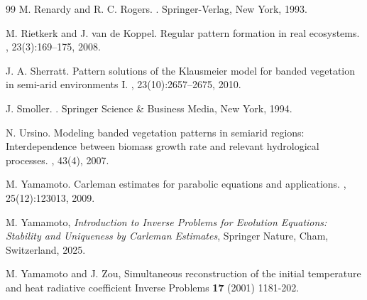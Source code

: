 \documentclass[12pt]{amsart}
\theoremstyle{plain}
\theoremstyle{definition}
\theoremstyle{remark}
\begin{document}
\begin{thebibliography}{99}
M. Renardy and R. C. Rogers.
.
\newblock Springer-Verlag, New York, 1993.

M. Rietkerk and J. van de Koppel.
\newblock Regular pattern formation in real ecosystems.
, 23(3):169--175, 2008.

J. A. Sherratt.
\newblock Pattern solutions of the Klausmeier model for banded vegetation in semi-arid environments I.
, 23(10):2657--2675, 2010.

J. Smoller.
. 
\newblock Springer Science \& Business Media, New York, 1994.

N. Ursino.
\newblock Modeling banded vegetation patterns in semiarid regions: Interdependence between biomass growth rate and relevant hydrological processes.
, 43(4), 2007.

M. Yamamoto.
\newblock Carleman estimates for parabolic equations and applications.
, 25(12):123013, 2009.


M. Yamamoto,
{\it Introduction to Inverse Problems for Evolution Equations: Stability and Uniqueness by Carleman Estimates},
Springer Nature, Cham, Switzerland, 2025.

M. Yamamoto and J. Zou, Simultaneous reconstruction of the initial temperature 
and heat radiative coefficient Inverse Problems {\bf 17} (2001) 1181-202.

\end{thebibliography}



\end{document}
